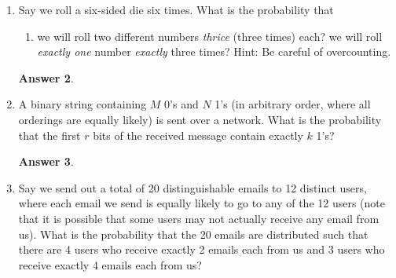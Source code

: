 \documentclass[12pt]{article}
\renewcommand{\(}{\left(}
\renewcommand{\)}{\right)}
\theoremstyle{definition}
\newtheorem*{answer}{Answer}
\begin{document}
\begin{enumerate}
\begin{enumerate}[label=\alph*.]
    \item there are no additional constraints?
    \item the robot must start by moving to the right?
    \item the robot changes direction exactly 3 times? Moving down two times in a
row is not changing directions, but switching from moving down to moving right is. 
For example, moving [down, right, right, down] would count as having two direction changes.

    \end{enumerate}

    \begin{shaded}
    \begin{answer}

    \end{answer}
    \end{shaded}
    \newpage


\item Say we roll a six-sided die six times. What is the probability that
    \begin{enumerate}[label=\alph*.]
    \item we will roll two different numbers \textit{thrice} (three times) each?
    we will roll \textit{exactly one} number \textit{exactly} three times? Hint: Be careful of overcounting.
    \end{enumerate}

    \begin{shaded}
    \begin{answer}

    \end{answer}
    \end{shaded}
    \newpage


\item A binary string containing $M$  0's and $N$  1's (in arbitrary order, where all orderings are equally likely) is sent over a network.  What is the probability that the first $r$ bits of the received message contain exactly $k$  1's?

    \begin{shaded}
    \begin{answer}

    \end{answer}
    \end{shaded}
    \newpage


\item Say we send out a total of 20 distinguishable emails to 12 distinct users, where each email we send is equally likely to go to any of the 12 users (note that it is possible that some users may not actually receive any email from us).  What is the probability that the 20 emails are distributed such that there are 4 users who receive exactly 2 emails each from us and 3 users who receive exactly 4 emails each from us?


\end{enumerate}
\end{document}
